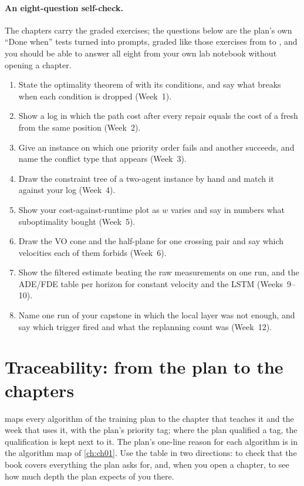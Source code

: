 \paragraph{An eight-question self-check.}
The chapters carry the graded exercises; the questions below are the plan's own ``Done
when'' tests turned into prompts, graded like those exercises from  to
, and you should be able to answer all eight from your own lab notebook
without opening a chapter.
\begin{enumerate}
  \item {} State the optimality theorem of \astar with its conditions, and say
    what breaks when each condition is dropped (Week~1).
  \item {} Show a log in which the path cost after every \dstarlite repair
    equals the cost of a fresh \astar from the same position (Week~2).
  \item {} Give an instance on which one priority order fails and another
    succeeds, and name the conflict type that appears (Week~3).
  \item {} Draw the constraint tree of a two-agent instance by hand and match it
    against your \cbs log (Week~4).
  \item {} Show your cost-against-runtime plot as $w$ varies and say in numbers
    what suboptimality bought (Week~5).
  \item {} Draw the VO cone and the \orca half-plane for one crossing pair and
    say which velocities each of them forbids (Week~6).
  \item {} Show the filtered estimate beating the raw measurements on one run,
    and the ADE/FDE table per horizon for constant velocity and the LSTM (Weeks~9--10).
  \item {} Name one run of your capstone in which the local layer was not
    enough, and say which trigger fired and what the replanning count was (Week~12).
\end{enumerate}
\FloatBarrier

\section{Traceability: from the plan to the chapters}
\label{sec:appA-traceability}

 maps every algorithm of the training plan to the chapter that
teaches it and the week that uses it, with the plan's priority tag; where the plan qualified
a tag, the qualification is kept next to it. The plan's one-line reason for each algorithm
is in the algorithm map of \cref{ch:ch01}. Use the table in two directions: to check that the
book covers everything the plan asks for, and, when you open a chapter, to see how much
depth the plan expects of you there.

